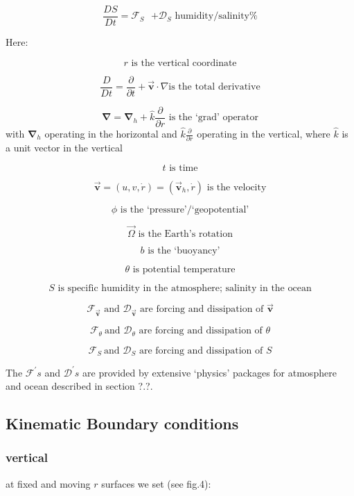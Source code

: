 \[
\frac{DS}{Dt}=\mathcal{F}_{S}\text{ }\mathcal{+D}_{S}\text{ humidity/salinity%
} 
\]

Here:

\[
r\text{ is the vertical coordinate} 
\]

\[
\frac{D}{Dt}=\frac{\partial }{\partial t}+\vec{\mathbf{v}}\cdot \nabla \text{
is the total derivative} 
\]

\[
\mathbf{\nabla }=\mathbf{\nabla }_{h}+\widehat{k}\frac{\partial }{\partial r}%
\text{ is the `grad' operator} 
\]
with $\mathbf{\nabla }_{h}$ operating in the horizontal and $\widehat{k}%
\frac{\partial }{\partial r}$ operating in the vertical, where $\widehat{k}$
is a unit vector in the vertical

\[
t\text{ is time} 
\]

\[
\vec{\mathbf{v}}=(u,v,\dot{r})=(\vec{\mathbf{v}}_{h},\dot{r})\text{ is the
velocity} 
\]

\[
\phi \text{ is the `pressure'/`geopotential'} 
\]

\[
\vec{\Omega}\text{ is the Earth's rotation} 
\]

\[
b\text{ is the `buoyancy'} 
\]

\[
\theta \text{ is potential temperature} 
\]

\[
S\text{ is specific humidity in the atmosphere; salinity in the ocean} 
\]

\[
\mathcal{F}_{\vec{\mathbf{v}}}\text{ and }\mathcal{D}_{\vec{\mathbf{v}}}%
\text{ are forcing and dissipation of }\vec{\mathbf{v}} 
\]

\[
\mathcal{F}_{\theta }\mathcal{\ }\text{and }\mathcal{D}_{\theta }\text{ are
forcing and dissipation of }\theta 
\]

\[
\mathcal{F}_{S}\mathcal{\ }\text{and }\mathcal{D}_{S}\text{ are forcing and
dissipation of }S 
\]

The $\mathcal{F}^{\prime }s$ and $\mathcal{D}^{\prime }s$ are provided by
extensive `physics' packages for atmosphere and ocean described in section
?.?.

\subsection{Kinematic Boundary conditions}

\subsubsection{vertical}

at fixed and moving $r$ surfaces we set (see fig.4):

